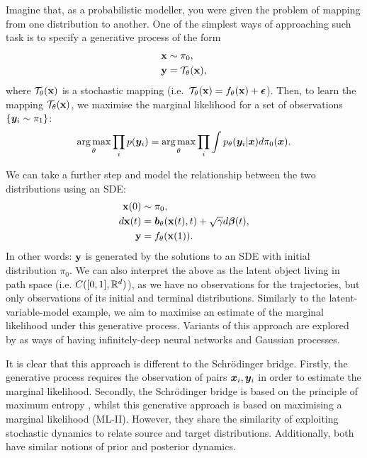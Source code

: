 \documentclass[a4paper,12pt,twoside,openright]{report}
\theoremstyle{definition}
\begin{document}
Imagine that, as a probabilistic modeller, you were given the problem of mapping from one distribution to another. One of the simplest ways of approaching such task is to specify a generative process of the form
\begin{align*}
    {\mathbf{x}} &\sim \pi_0, \\
    {\mathbf{y}} &= {\mathcal{T}}_{\theta}({\mathbf{x}}),
\end{align*}
where ${\mathcal{T}}_{\theta}({\mathbf{x}})$  is a stochastic mapping (i.e.\ ${\mathcal{T}}_{\theta}({\mathbf{x}}) = f_{\theta}({\mathbf{x}}) + {\bm{\epsilon}}$). Then, to learn the mapping ${\mathcal{T}}_{\theta}({\mathbf{x}})$, we maximise the marginal likelihood for a set of observations $\{{\bm{y}}_i \sim \pi_1 \}$:
\begin{align*}
   \operatorname*{arg\,max}_{\theta} \prod_i p({\bm{y}}_i) = \operatorname*{arg\,max}_{\theta} \prod_i \int p_{\theta}({\bm{y}}_i | {\bm{x}}) d\pi_0({\bm{x}}).
\end{align*}

We can take a further step and model the relationship between the two distributions using an SDE:
\begin{align*}
    {\mathbf{x}}(0) &\sim \pi_0, \\
    d{\mathbf{x}}(t) &= {\bm{b}}_{\theta}({\mathbf{x}}(t), t) + \sqrt{\gamma} d{\bm{\beta}}(t), \\
    {\mathbf{y}} &= f_{\theta}({\mathbf{x}}(1)).
\end{align*}
In other words: ${\mathbf{y}}$ is generated by the solutions to an SDE with initial distribution $\pi_0$. We can also interpret the above as the latent object living in path space (i.e. $C([0,1],{\mathbb{R}}^d)$), as we have no observations for the trajectories, but only observations of its initial and terminal distributions. Similarly to the latent-variable-model example, we aim to maximise an estimate of the marginal likelihood under this generative process. Variants of this approach are explored by \citep{lahdesmakideep, tzen2019neural} as ways of having infinitely-deep neural networks and Gaussian processes.

It is clear that this approach is different to the Schrödinger bridge. Firstly, the generative process requires the observation of pairs ${\bm{x}}_i, {\bm{y}}_i$ in order to estimate the marginal likelihood. Secondly, the Schrödinger bridge is based on the principle of maximum entropy \citep{jaynes1957information}, whilst this generative approach is based on maximising a marginal likelihood (ML-II). However, they share the similarity of exploiting stochastic dynamics to relate source and target distributions. Additionally, both have similar notions of prior and posterior dynamics.
\end{document}
